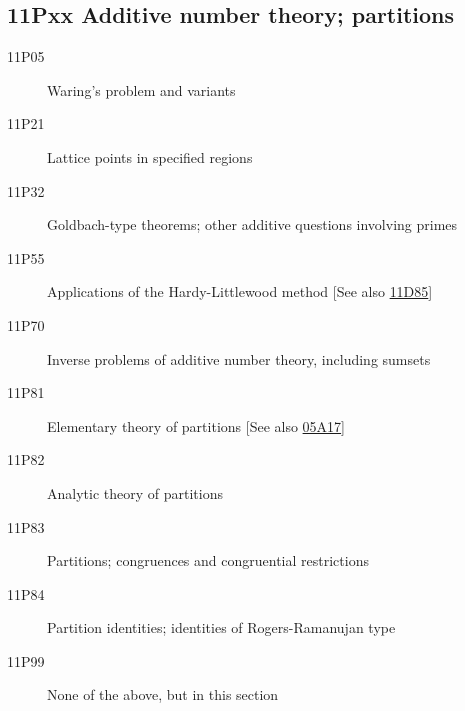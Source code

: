 \subsection*{11Pxx  Additive number theory; partitions }\label{11Pxx}
\begin{description}  
\item [11P05]\label{11P05} Waring's problem and variants
\item [11P21]\label{11P21} Lattice points in specified regions
\item [11P32]\label{11P32} Goldbach-type theorems; other additive questions involving primes
\item [11P55]\label{11P55} Applications of the Hardy-Littlewood method [See also \hyperref[11D85]{11D85}]
\item [11P70]\label{11P70} Inverse problems of additive number theory, including sumsets
\item [11P81]\label{11P81} Elementary theory of partitions [See also \hyperref[05A17]{05A17}]
\item [11P82]\label{11P82} Analytic theory of partitions
\item [11P83]\label{11P83} Partitions; congruences and congruential restrictions
\item [11P84]\label{11P84} Partition identities; identities of Rogers-Ramanujan type
\item [11P99]\label{11P99} None of the above, but in this section
\end{description}
